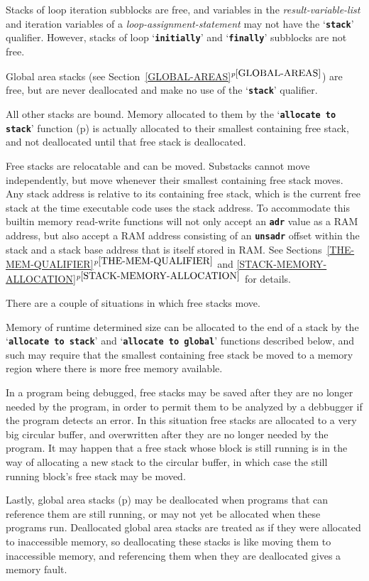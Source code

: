 \documentclass[12pt]{article}
\newcommand{\TT}[1]{{\tt \bfseries #1}}
\newcommand{\itemref}[1]{\ref{#1}$^{p\pageref{#1}}$}
\newcommand{\pagref}[1]{p\pageref{#1}}
\begin{document}
Stacks of loop iteration subblocks are free, and
variables in the {\em result-variable-list}
and iteration variables
of a {\em loop-assignment-statement} may not have the `\TT{stack}'
qualifier.  However, stacks of loop `\TT{initially}' and `\TT{finally}'
subblocks are not free.

Global area stacks (see Section~\itemref{GLOBAL-AREAS}) are free,
but are never deallocated and make no use of the `\TT{stack}'
qualifier.

All other stacks are bound.  Memory allocated to them
by the `\TT{allocate to stack}' function (\pagref{ALLOCATE-TO-STACK})
is actually
allocated to their smallest containing free stack, and not deallocated
until that free stack is deallocated.

Free stacks are relocatable and can be moved.
Substacks cannot move independently,
but move whenever their smallest containing free stack moves.
Any stack address is relative to its containing free stack,
which is the current free stack at the time executable code uses
the stack address.  To accommodate this builtin memory read-write
functions will not only accept an \TT{adr} value as a RAM address,
but also accept a RAM address consisting of an \TT{unsadr}
offset within the stack and a stack base address that is itself
stored in RAM.  See Sections~\itemref{THE-MEM-QUALIFIER}
and \itemref{STACK-MEMORY-ALLOCATION}
for details.

There are a couple of situations in which free stacks move.

Memory of runtime determined size can be allocated to the end of
a stack by the `\TT{allocate to stack}' and `\TT{allocate to global}'
functions described below, and such may
require that the smallest containing free stack
be moved to a memory region where there is more free memory available.

In a program being debugged, free stacks may be saved after they are no
longer needed by the program, in order to permit them to be analyzed
by a debbugger if the program detects an error.  In this situation
free stacks are allocated to a very big circular buffer, and overwritten
after they are no longer needed by the program.  It may happen that
a free stack whose block is still running is in the way of allocating
a new stack to the circular buffer, in which case the still running
block's free stack may be moved.

Lastly, global area stacks (\pagref{GLOBAL-AREAS})
may be deallocated when programs that
can reference them are still running, or may not yet be allocated
when these programs run.  Deallocated global area stacks are treated as if
they were allocated to inaccessible memory, so deallocating these stacks
is like moving them to inaccessible memory, and referencing
them when they are deallocated gives a memory fault.
\end{document}
